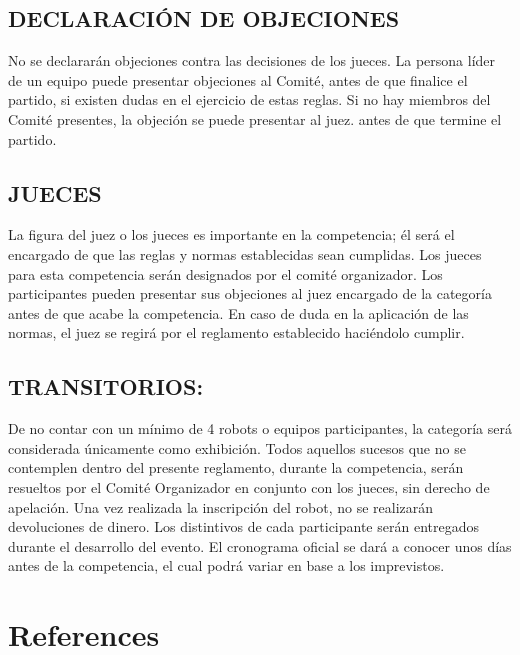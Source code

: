 \documentclass[
  letterpaper,
  DIV=11,
  numbers=noendperiod]{scrreprt}
\begin{document}
\section{DECLARACIÓN DE OBJECIONES}\label{declaraciuxf3n-de-objeciones}

No se declararán objeciones contra las decisiones de los jueces. La
persona líder de un equipo puede presentar objeciones al Comité, antes
de que finalice el partido, si existen dudas en el ejercicio de estas
reglas. Si no hay miembros del Comité presentes, la objeción se puede
presentar al juez. antes de que termine el partido.

\section{JUECES}\label{jueces-1}

La figura del juez o los jueces es importante en la competencia; él será
el encargado de que las reglas y normas establecidas sean cumplidas. Los
jueces para esta competencia serán designados por el comité organizador.
Los participantes pueden presentar sus objeciones al juez encargado de
la categoría antes de que acabe la competencia. En caso de duda en la
aplicación de las normas, el juez se regirá por el reglamento
establecido haciéndolo cumplir.

\section{TRANSITORIOS:}\label{transitorios-1}

De no contar con un mínimo de 4 robots o equipos participantes, la
categoría será considerada únicamente como exhibición. Todos aquellos
sucesos que no se contemplen dentro del presente reglamento, durante la
competencia, serán resueltos por el Comité Organizador en conjunto con
los jueces, sin derecho de apelación. Una vez realizada la inscripción
del robot, no se realizarán devoluciones de dinero. Los distintivos de
cada participante serán entregados durante el desarrollo del evento. El
cronograma oficial se dará a conocer unos días antes de la competencia,
el cual podrá variar en base a los imprevistos.


\chapter*{References}\label{references}


\label{refs}
\end{document}
